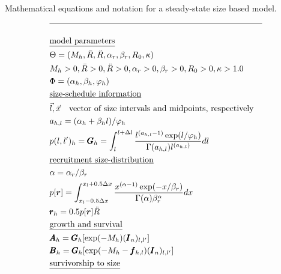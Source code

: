\documentclass[12pt,letterpaper]{article}
\newcounter{saveEq}
\def\putEq{\setcounter{saveEq}{\value{equation}}}
\def\tableEq{ %
    \putEq \setcounter{equation}{0}
    \renewcommand{\theequation}{T\arabic{table}.\arabic{equation}}
    \vspace{-5mm}
    }
\begin{document}
\begin{table}
  \centering
\caption{Mathematical equations and notation for a steady-state size based model.}
\label{tab:equilibrium_model}
\tableEq
  \begin{align}
    \hline \nonumber \\
    &\mbox{\underline{model parameters}} \nonumber\\
    &\Theta = (M_h,\bar{R},\ddot{R},\alpha_r,\beta_r,R_0,\kappa) \label{T1.1}\\
    &M_h > 0 , \bar{R} > 0, \ddot{R}>0, \alpha_r > 0, \beta_r > 0, R_0>0,\kappa > 1.0 \label{T1.2}\\
    &\Phi = (\alpha_h,\beta_h,\varphi_h) \label{T1.3}\\
    &\mbox{\underline{size-schedule information}} \nonumber \\
    &\vec{l},\vec{x} \quad \mbox{vector of size intervals and midpoints, respectively} \nonumber\\
    &a_{h,l} = (\alpha_h + \beta_h l)/\varphi_h \label{T1.4} \\
    &p({l},{l'})_h =\pmb{G}_h= \int_{l}^{l+\Delta l}
        \frac{ l^{(a_{h,l}-1)} \exp(l/\varphi_h) }
        { \Gamma(a_{h,l}) l^{(a_{h,l})} } dl \label{T1.5} \\
    &\mbox{\underline{recruitment size-distribution}} \nonumber \\
    & \alpha = \alpha_r / \beta_r  \\
    &p[\bm{r}] = \int_{x_l-0.5\Delta x}^{x_l+0.5\Delta x}
      \frac{x^{(\alpha-1)}\exp(- x / \beta_r)}{\Gamma(\alpha)\beta_r^\alpha}dx
        \label{T1.7}\\
    &\pmb{r}_h = 0.5 p[\bm{r}] \ddot{R} \label{T1.8}\\
    &\mbox{\underline{growth and survival}} \nonumber \\
    &\pmb{A}_h = \pmb{G}_h [\exp(-M_h) (\pmb{I}_n)_{l,l'}]\label{T1.10}\\
    &\pmb{B}_h = \pmb{G}_h [\exp(-M_h - \pmb{f}_{h,l}) (\pmb{I}_n)_{l,l'}] \label{T1.12}\\
    &\mbox{\underline{survivorship to size}} \nonumber \\

\end{align}
\end{table}
\end{document}
